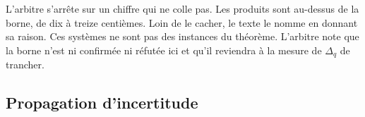 \begin{boiteArbitre}
L'arbitre s'arr\^ete sur un chiffre qui ne colle pas. Les produits sont
au-dessus de la borne, de dix \`a treize centi\`emes. Loin de le cacher, le texte
le nomme en donnant sa raison. Ces syst\`emes ne sont pas des instances
du th\'eor\`eme. L'arbitre note que la borne n'est ni confirm\'ee ni r\'efut\'ee
ici et qu'il reviendra \`a la mesure de $\Delta_q$ de trancher.
\end{boiteArbitre}

\subsection{Propagation d'incertitude}
\label{sec:intervalles_bootstrap}
